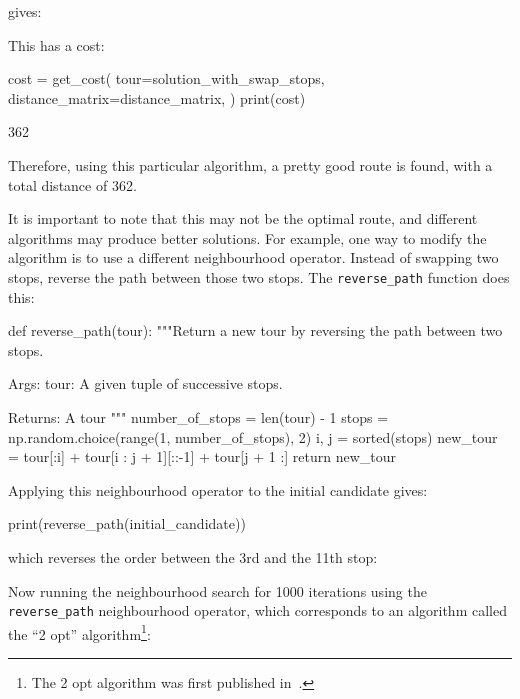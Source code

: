 gives:

\begin{pyout}
[0, 7, 2, 8, 5, 3, 1, 9, 12, 11, 4, 10, 6, 0]
\end{pyout}

This has a cost:

\begin{pyin}
cost = get_cost(
    tour=solution_with_swap_stops,
    distance_matrix=distance_matrix,
)
print(cost)
\end{pyin}

\begin{pyout}
362
\end{pyout}

Therefore, using this particular algorithm, a pretty good route is found, with a
total distance of 362.

It is important to note that this may not be the optimal route, and different algorithms
may produce better solutions.
For example, one way to modify the algorithm is to use a different neighbourhood operator.
Instead of swapping two stops, reverse the path between those two
stops. The \texttt{reverse_path} function does this:

\begin{pyin}
def reverse_path(tour):
    """Return a new tour by reversing the path between two
    stops.

    Args:
        tour: A given tuple of successive stops.

    Returns:
        A tour
    """
    number_of_stops = len(tour) - 1
    stops = np.random.choice(range(1, number_of_stops), 2)
    i, j = sorted(stops)
    new_tour = tour[:i] + tour[i : j + 1][::-1] + tour[j + 1 :]
    return new_tour
\end{pyin}

Applying this neighbourhood operator to the initial candidate gives:

\begin{pyin}
print(reverse_path(initial_candidate))
\end{pyin}

which reverses the order between the 3rd and the 11th stop:

\begin{pyout}
[0, 7, 4, 10, 8, 2, 9, 3, 11, 5, 12, 1, 6, 0]
\end{pyout}

Now running the neighbourhood search for 1000 iterations using the
\texttt{reverse_path} neighbourhood operator, which corresponds to
an algorithm called the ``2 opt'' algorithm\footnote{The 2 opt algorithm was
first published in~\autocite{croes1958method}.
}:

